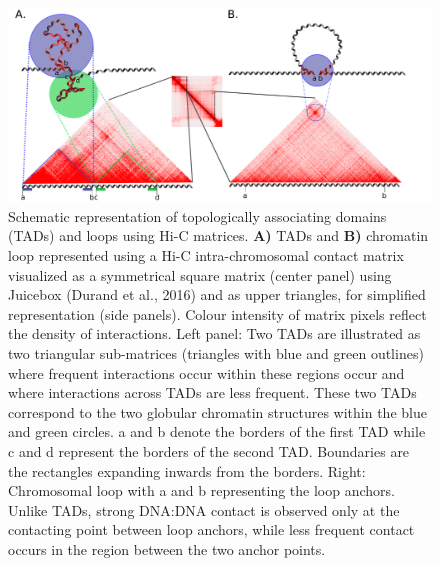\documentclass[11pt,a4paper]{report}
\begin{document}
\begin{figure}[ht]
	\includegraphics[width=1\textwidth]{Figures/3_TAD_loop_definition.pdf}
	\caption{Schematic representation of topologically associating domains (TADs) and loops using Hi-C matrices. \textbf{A)} TADs and \textbf{B)} chromatin loop represented using a Hi-C intra-chromosomal contact matrix visualized as a symmetrical square matrix (center panel) using Juicebox (Durand et al., 2016)⁠ and as upper triangles, for simplified representation (side panels). Colour intensity of matrix pixels reflect the density of interactions. Left panel: Two TADs are illustrated as two triangular sub-matrices (triangles with blue and green outlines) where frequent interactions occur within these regions occur and where interactions across TADs are less frequent. These two TADs correspond to the two globular chromatin structures within the blue and green circles. a and b denote the borders of the first TAD while c and d represent the borders of the second TAD. Boundaries are the rectangles expanding inwards from the borders. Right: Chromosomal loop with a and b representing the loop anchors. Unlike TADs, strong DNA:DNA contact is observed only at the contacting point between loop anchors, while less frequent contact occurs in the region between the two anchor points. }
	\label{TAD_loop_def}
\end{figure}
\end{document}
